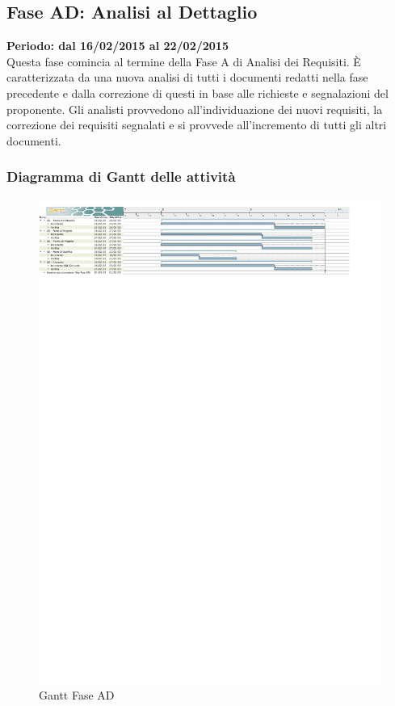 \subsection{Fase AD: Analisi al Dettaglio}
\textbf{Periodo: dal 16/02/2015 al 22/02/2015}
\\
Questa fase comincia al termine della Fase A di Analisi dei Requisiti. È caratterizzata da una nuova analisi di tutti i documenti redatti nella fase precedente e dalla correzione di questi in base alle richieste e segnalazioni del proponente. Gli analisti provvedono all'individuazione dei nuovi requisiti, la correzione dei requisiti segnalati e si provvede all'incremento di tutti gli altri documenti.
\subsubsection{Diagramma di Gantt delle attività}
\begin{center}
	\begin{figure}[here]\centering
		\includegraphics[width=\textwidth]{PianoDiProgetto/Pics/FaseAD}
		\caption{Gantt Fase AD}
	\end{figure}
\end{center}